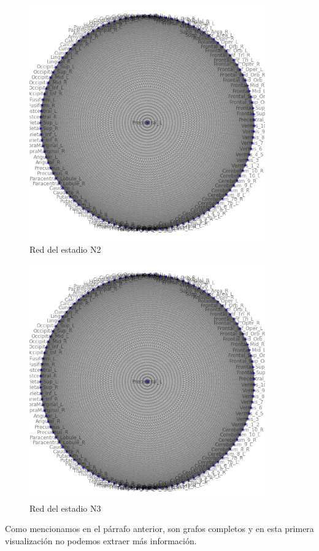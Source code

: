 \begin{figure}[H]
    \centering
    \includegraphics[width = 4in]{img/avg_n2.png}
    \caption{Red del estadio N2}
    \label{fig:avg-n2}
\end{figure}

\begin{figure}[H]
    \centering
    \includegraphics[width = 4in]{img/avg_n3.png}
    \caption{Red del estadio N3}
    \label{fig:avg-n3}
\end{figure}

Como mencionamos en el párrafo anterior, son grafos completos y en esta primera visualización no podemos extraer más información.

